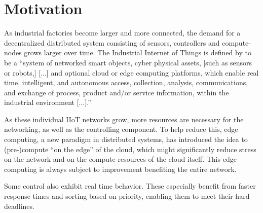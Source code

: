 \section{Motivation}

As industrial factories become larger and more connected, the demand for a
decentralized distributed system consisting of sensors, controllers and
compute-nodes grows larger over time.
The Industrial Internet of Things is defined by
\citeauthor{boyes_industrial_2018} to be a \enquote{system of networked smart
    objects, cyber physical assets, [such as sensors or robots,] [$\dots$] and
    optional cloud or edge computing platforms, which enable real time,
    intelligent, and autonomous access, collection, analysis, communications,
    and exchange of process, product and/or service information, within the
    industrial environment [$\dots$].}%


As these individual IIoT networks grow, more resources are necessary for the
networking, as well as the controlling component. To help reduce this, edge
computing, a new paradigm in distributed systems, has introduced the idea to
(pre-)compute \enquote{on the edge} of the cloud, which might significantly
reduce stress on the network and on the compute-resources of the cloud itself.
This edge computing is always subject to improvement benefiting the entire network.

Some control also exhibit real time behavior. These especially benefit from
faster response times and sorting based on priority, enabling them to meet their
hard deadlines.



